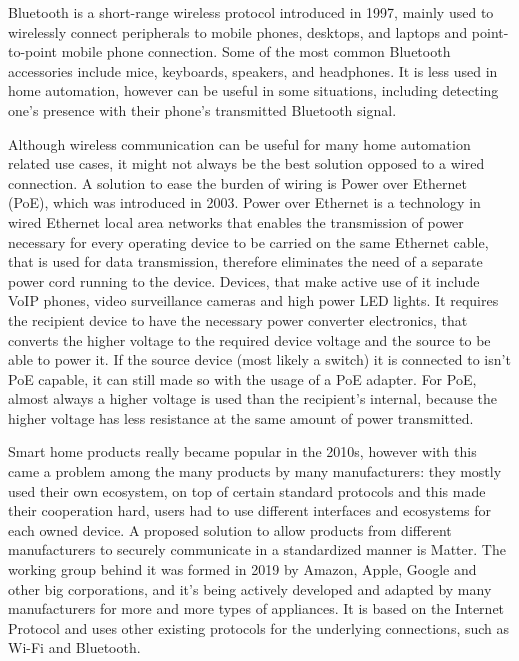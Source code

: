Bluetooth is a short-range wireless protocol introduced in 1997, mainly used to wirelessly connect peripherals to mobile phones, desktops, and laptops and point-to-point mobile phone connection. \cite{IntelBluetooth} Some of the most common Bluetooth accessories include mice, keyboards, speakers, and headphones. It is less used in home automation, however can be useful in some situations, including detecting one's presence with their phone's transmitted Bluetooth signal. %

Although wireless communication can be useful for many home automation related use cases, it might not always be the best solution opposed to a wired connection. A solution to ease the burden of wiring is Power over Ethernet (PoE), which was introduced in 2003. \cite{TTPoE} Power over Ethernet is a technology in wired Ethernet local area networks that enables the transmission of power necessary for every operating device to be carried on the same Ethernet cable, that is used for data transmission, therefore eliminates the need of a separate power cord running to the device. Devices, that make active use of it include VoIP phones, video surveillance cameras and high power LED lights. It requires the recipient device to have the necessary power converter electronics, that converts the higher voltage to the required device voltage and the source to be able to power it. If the source device (most likely a switch) it is connected to isn't PoE capable, it can still made so with the usage of a PoE adapter. For PoE, almost always a higher voltage is used than the recipient's internal, because the higher voltage has less resistance at the same amount of power transmitted.

Smart home products really became popular in the 2010s, however with this came a problem among the many products by many manufacturers: they mostly used their own ecosystem, on top of certain standard protocols and this made their cooperation hard, users had to use different interfaces and ecosystems for each owned device. A proposed solution to allow products from different manufacturers to securely communicate in a standardized manner is Matter. \cite{PCMagMatter} The working group behind it was formed in 2019 by Amazon, Apple, Google and other big corporations, and it's being actively developed and adapted by many manufacturers for more and more types of appliances. It is based on the Internet Protocol and uses other existing protocols for the underlying connections, such as Wi-Fi and Bluetooth.

